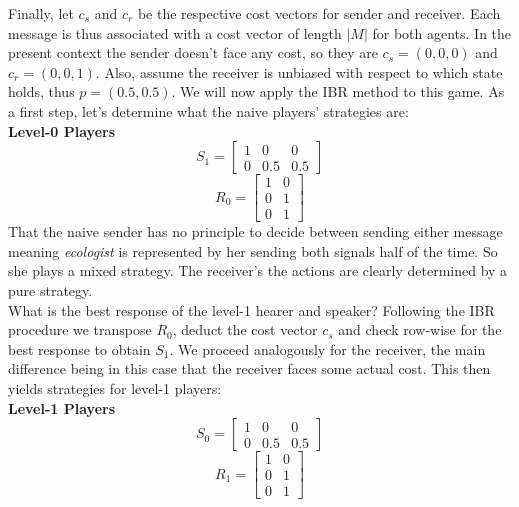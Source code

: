 \documentclass{article}
\begin{document}
Finally, let $c_s$ and $c_r$ be the respective cost vectors for sender and receiver. Each message is thus associated with a cost vector of length $|M|$ for both agents. In the present context the sender doesn't face any cost, so they are $c_s=(0,0,0)$ and $c_r=(0,0,1)$. %
Also, assume the receiver is unbiased with respect to which state holds, thus $p=(0.5,0.5)$.
We will now apply the IBR method to this game. As a first step, let's determine what the naive players' strategies are:\\
\textbf{Level-0 Players}\\
\begin{equation*}
S_1=
\begin{bmatrix}
1 & 0 & 0\\
0 & 0.5 & 0.5
\end{bmatrix}
\end{equation*}
\begin{equation*}
R_0=
\begin{bmatrix}
1 & 0\\
0 & 1\\
0 & 1
\end{bmatrix}
\end{equation*}
That the naive sender has no principle to decide between sending either message meaning \textit{ecologist} is represented by her sending both signals half of the time. So she plays a mixed strategy. The receiver's the actions are clearly determined by a pure strategy.\\
What is the best response of the level-1 hearer and speaker? Following the IBR procedure we transpose $R_0$, deduct the cost vector $c_s$ and check row-wise for the best response to obtain $S_1$. We proceed analogously for the receiver, the main difference being in this case that the receiver faces some actual cost. This then yields strategies for level-1 players:\\ %
\textbf{Level-1 Players}\\
\begin{equation*}
S_0=
\begin{bmatrix}
1 & 0 & 0\\
0 & 0.5 & 0.5
\end{bmatrix}
\end{equation*}
\begin{equation*}
R_1=
\begin{bmatrix}
1 & 0\\
0 & 1\\
0 & 1
\end{bmatrix}
\end{equation*}
\end{document}
